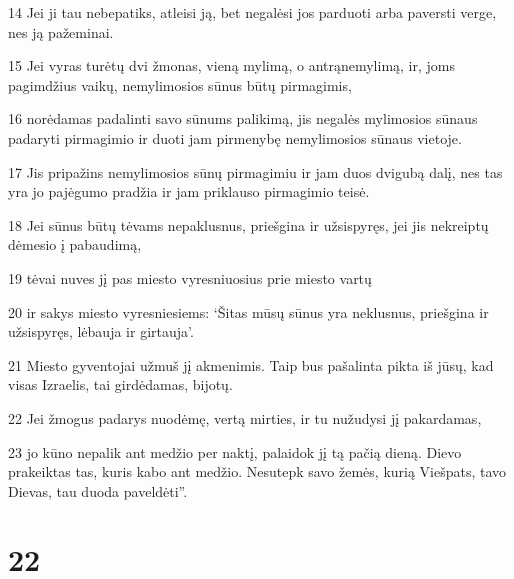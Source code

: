 \par 14 Jei ji tau nebepatiks, atleisi ją, bet negalėsi jos parduoti arba paversti verge, nes ją pažeminai. 
\par 15 Jei vyras turėtų dvi žmonas, vieną mylimą, o antrą­nemylimą, ir, joms pagimdžius vaikų, nemylimosios sūnus būtų pirmagimis, 
\par 16 norėdamas padalinti savo sūnums palikimą, jis negalės mylimosios sūnaus padaryti pirmagimio ir duoti jam pirmenybę nemylimosios sūnaus vietoje. 
\par 17 Jis pripažins nemylimosios sūnų pirmagimiu ir jam duos dvigubą dalį, nes tas yra jo pajėgumo pradžia ir jam priklauso pirmagimio teisė. 
\par 18 Jei sūnus būtų tėvams nepaklusnus, priešgina ir užsispyręs, jei jis nekreiptų dėmesio į pabaudimą, 
\par 19 tėvai nuves jį pas miesto vyresniuosius prie miesto vartų 
\par 20 ir sakys miesto vyresniesiems: ‘Šitas mūsų sūnus yra neklusnus, priešgina ir užsispyręs, lėbauja ir girtauja’. 
\par 21 Miesto gyventojai užmuš jį akmenimis. Taip bus pašalinta pikta iš jūsų, kad visas Izraelis, tai girdėdamas, bijotų. 
\par 22 Jei žmogus padarys nuodėmę, vertą mirties, ir tu nužudysi jį pakardamas, 
\par 23 jo kūno nepalik ant medžio per naktį, palaidok jį tą pačią dieną. Dievo prakeiktas tas, kuris kabo ant medžio. Nesutepk savo žemės, kurią Viešpats, tavo Dievas, tau duoda paveldėti”.



\chapter{22}



